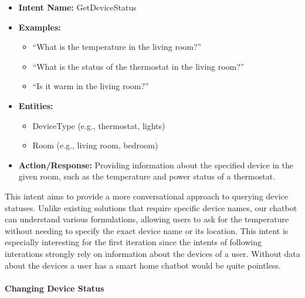 \begin{itemize}
    \item \textbf{Intent Name:} GetDeviceStatus
    \item \textbf{Examples:}
    \begin{itemize}
        \item ``What is the temperature in the living room?''
        \item ``What is the status of the thermostat in the living room?''
        \item ``Is it warm in the living room?''
    \end{itemize}
    \item \textbf{Entities:}
    \begin{itemize}
        \item DeviceType (e.g., thermostat, lights)
        \item Room (e.g., living room, bedroom)
    \end{itemize}
    \item \textbf{Action/Response:} Providing information about the specified device in the given room, such as the temperature and power status of a thermostat.
\end{itemize}

This intent aims to provide a more conversational approach to querying device statuses. Unlike existing solutions that require specific device names, our chatbot can understand various formulations, allowing users to ask for the temperature without needing to specify the exact device name or its location.
This intent is especially interesting for the first iteration since the intents of following interations strongly rely on information about the devices of a user. Without data about the devices a user has a smart home chatbot would be quite pointless.

\paragraph{Changing Device Status}

